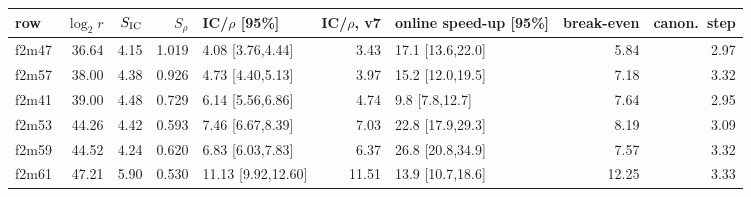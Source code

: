 \begin{tabular}{@{}lrrrlrlrr@{}}
\toprule
row & $\log_2 r$ & $S_{\rm IC}$ & $S_\rho$ & IC/$\rho$ [95\%] & IC/$\rho$, v7 & online speed-up [95\%] & break-even & canon.\ step \\
\midrule
f2m47 & 36.64 & 4.15 & 1.019 & 4.08 [3.76,4.44] & 3.43 & 17.1 [13.6,22.0] & 5.84 & 2.97 \\
f2m57 & 38.00 & 4.38 & 0.926 & 4.73 [4.40,5.13] & 3.97 & 15.2 [12.0,19.5] & 7.18 & 3.32 \\
f2m41 & 39.00 & 4.48 & 0.729 & 6.14 [5.56,6.86] & 4.74 & 9.8 [7.8,12.7] & 7.64 & 2.95 \\
f2m53 & 44.26 & 4.42 & 0.593 & 7.46 [6.67,8.39] & 7.03 & 22.8 [17.9,29.3] & 8.19 & 3.09 \\
f2m59 & 44.52 & 4.24 & 0.620 & 6.83 [6.03,7.83] & 6.37 & 26.8 [20.8,34.9] & 7.57 & 3.32 \\
f2m61 & 47.21 & 5.90 & 0.530 & 11.13 [9.92,12.60] & 11.51 & 13.9 [10.7,18.6] & 12.25 & 3.33 \\
\bottomrule
\end{tabular}
